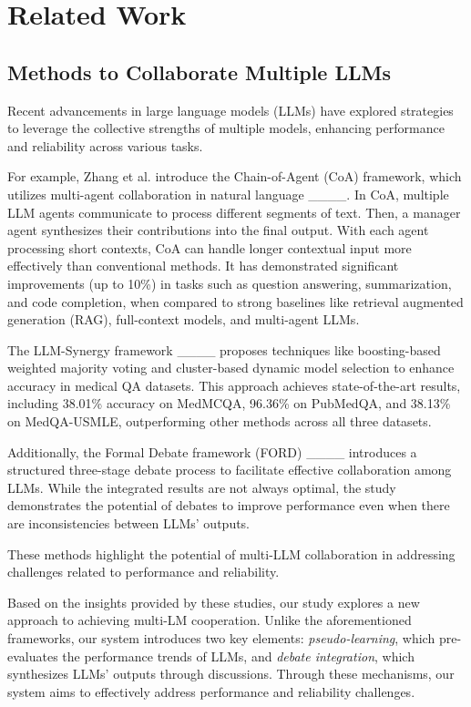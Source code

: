 \section{Related Work}
\label{sec-relatedwork}
\subsection{Methods to Collaborate Multiple LLMs}

Recent advancements in large language models (LLMs) have explored strategies to leverage the collective strengths of multiple models, enhancing performance and reliability across various tasks.

For example, Zhang et al. introduce the Chain-of-Agent (CoA) framework, which utilizes multi-agent collaboration in natural language ____.
In CoA, multiple LLM agents communicate to process different segments of text.
Then, a manager agent synthesizes their contributions into the final output.
With each agent processing short contexts, CoA can handle longer contextual input more effectively than conventional methods.
It has demonstrated significant improvements (up to 10\%) in tasks such as question answering, summarization, and code completion, when compared to strong baselines like retrieval augmented generation (RAG), full-context models, and multi-agent LLMs.

The LLM-Synergy framework ____ proposes techniques like boosting-based weighted majority voting and cluster-based dynamic model selection to enhance accuracy in medical QA datasets.
This approach achieves state-of-the-art results, including 38.01\% accuracy on MedMCQA, 96.36\% on PubMedQA, and 38.13\% on MedQA-USMLE, outperforming other methods across all three datasets.

Additionally, the Formal Debate framework (FORD) ____ introduces a structured three-stage debate process to facilitate effective collaboration among LLMs.
While the integrated results are not always optimal, the study demonstrates the potential of debates to improve performance even when there are inconsistencies between LLMs' outputs.

These methods highlight the potential of multi-LLM collaboration in addressing challenges related to performance and reliability.

Based on the insights provided by these studies, our study explores a new approach to achieving multi-LM cooperation.
Unlike the aforementioned frameworks, our system introduces two key elements: \textit{pseudo-learning}, which pre-evaluates the performance trends of LLMs, and \textit{debate integration}, which synthesizes LLMs' outputs through discussions.
Through these mechanisms, our system aims to effectively address performance and reliability challenges.

